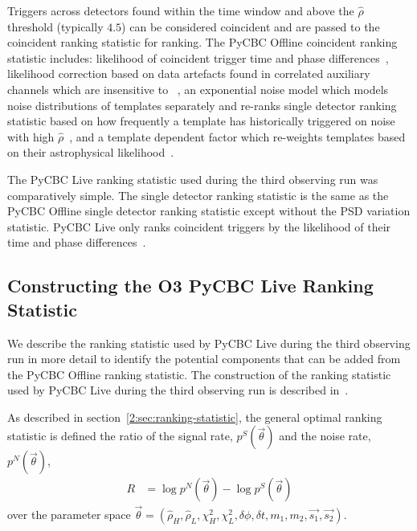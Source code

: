 Triggers across detectors found within the time window and above the $\hat{\rho}$ threshold (typically $4.5$) can be considered coincident and are passed to the coincident ranking statistic for ranking. The PyCBC Offline coincident ranking statistic includes: likelihood of coincident trigger time and phase differences~\cite{PyCBC:2016}, likelihood correction based on data artefacts found in correlated auxiliary channels which are insensitive to \gws~\cite{DQ_vetoes:2017, iDQ:2020}, an exponential noise model which models noise distributions of templates separately and re-ranks single detector ranking statistic based on how frequently a template has historically triggered on noise with high $\hat{\rho}$~\cite{PyCBC:2017}, and a template dependent factor which re-weights templates based on their astrophysical likelihood~\cite{PyCBC_focussed_bbh:2024}.

The PyCBC Live ranking statistic used during the third observing run was comparatively simple. The single detector ranking statistic is the same as the PyCBC Offline single detector ranking statistic except without the PSD variation statistic. PyCBC Live only ranks coincident triggers by the likelihood of their time and phase differences~\cite{PyCBC_Live:2018}.

\subsection{\label{5:sec:old-stat-construction}Constructing the O3 PyCBC Live Ranking Statistic}

We describe the ranking statistic used by PyCBC Live during the third observing run in more detail to identify the potential components that can be added from the PyCBC Offline ranking statistic. The construction of the ranking statistic used by PyCBC Live during the third observing run is described in~\cite{PyCBC_Live:2018}.

As described in section~\ref{2:sec:ranking-statistic}, the general optimal ranking statistic is defined the ratio of the signal rate, $ p^{S}(\Vec{\theta})$ and the noise rate,  $p^{N}(\Vec{\theta})$,
%
\begin{align}
    R &= \log p^{N}(\Vec{\theta}) - \log p^{S}(\Vec{\theta})
\end{align}
%
over the parameter space $\Vec{\theta} = \left(\hat{\rho}_{H}, \hat{\rho}_{L}, \chi^{2}_{H}, \chi^{2}_{L}, \delta\phi, \delta t, m_{1}, m_{2}, \Vec{s_{1}}, \Vec{s_{2}}\right)$. 

